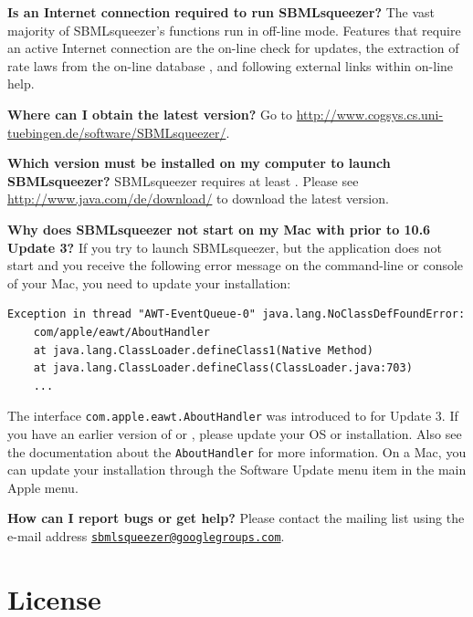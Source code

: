 \noindent \textbf{Is an Internet connection required to run SBMLsqueezer?}\newline
The vast majority of SBMLsqueezer's functions run in off-line mode.
Features that require an active Internet connection are the on-line check for updates, the extraction of rate laws from the on-line database \SABIO, and following external links within on-line help.
\newline

\noindent \textbf{Where can I obtain the latest version?}\newline
Go to \url{http://www.cogsys.cs.uni-tuebingen.de/software/SBMLsqueezer/}.\newline

\noindent \textbf{Which \Java version must be installed on my computer to launch SBMLsqueezer?}\newline
SBMLsqueezer requires at least . Please see \url{http://www.java.com/de/download/} to download the latest \Java version.\newline

\noindent \textbf{Why does SBMLsqueezer not start on my Mac with \MacOSX prior to 10.6 Update 3?}\newline
If you try to launch SBMLsqueezer, but the application does not start and you receive the following error message on the command-line or \Java console of your Mac, you need to update your \Java installation:
\begin{verbatim}
Exception in thread "AWT-EventQueue-0" java.lang.NoClassDefFoundError:
    com/apple/eawt/AboutHandler
    at java.lang.ClassLoader.defineClass1(Native Method)
    at java.lang.ClassLoader.defineClass(ClassLoader.java:703)
    ...
\end{verbatim}
The interface \texttt{com.apple.eawt.AboutHandler} was introduced to \Java for  Update 3. If you have an earlier version of \MacOSX or \Java, please update your OS or \Java installation.
Also see the \MacOSX documentation about the \texttt{AboutHandler} for more information. On a Mac, you can update your \Java installation through the Software Update menu item in the main Apple menu.
\newline

\noindent \textbf{How can I report bugs or get help?}\newline
Please contact the mailing list using the e-mail address 
\href{mailto:sbmlsqueezer@googlegroups.com}{\texttt{sbmlsqueezer@google\-groups.com}}.

\chapter{License}


